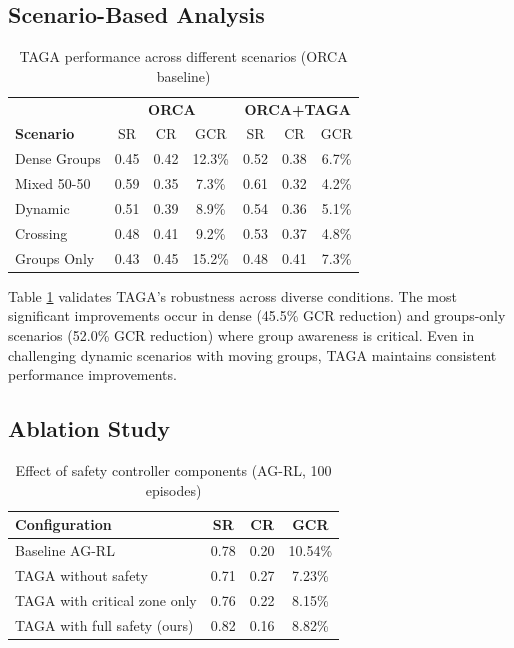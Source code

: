 \subsection{Scenario-Based Analysis}

\begin{table}[t]
\caption{TAGA performance across different scenarios (ORCA baseline)}
\label{table:scenarios}
\centering
\begin{tabular}{lccc|ccc}
\hline
 & \multicolumn{3}{c|}{\textbf{ORCA}} & \multicolumn{3}{c}{\textbf{ORCA+TAGA}} \\
\textbf{Scenario} & SR & CR & GCR & SR & CR & GCR \\
\hline
Dense Groups & 0.45 & 0.42 & 12.3\% & 0.52 & 0.38 & 6.7\% \\
Mixed 50-50 & 0.59 & 0.35 & 7.3\% & 0.61 & 0.32 & 4.2\% \\
Dynamic & 0.51 & 0.39 & 8.9\% & 0.54 & 0.36 & 5.1\% \\
Crossing & 0.48 & 0.41 & 9.2\% & 0.53 & 0.37 & 4.8\% \\
Groups Only & 0.43 & 0.45 & 15.2\% & 0.48 & 0.41 & 7.3\% \\
\hline
\end{tabular}
\end{table}

Table \ref{table:scenarios} validates TAGA's robustness across diverse conditions. The most significant improvements occur in dense (45.5\% GCR reduction) and groups-only scenarios (52.0\% GCR reduction) where group awareness is critical. Even in challenging dynamic scenarios with moving groups, TAGA maintains consistent performance improvements.

\subsection{Ablation Study}

\begin{table}[t]
\caption{Effect of safety controller components (AG-RL, 100 episodes)}
\label{table:ablation}
\centering
\begin{tabular}{lccc}
\hline
\textbf{Configuration} & \textbf{SR} & \textbf{CR} & \textbf{GCR} \\
\hline
Baseline AG-RL & 0.78 & 0.20 & 10.54\% \\
TAGA without safety & 0.71 & 0.27 & 7.23\% \\
TAGA with critical zone only & 0.76 & 0.22 & 8.15\% \\
TAGA with full safety (ours) & 0.82 & 0.16 & 8.82\% \\
\hline
\end{tabular}
\end{table}


